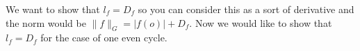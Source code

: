 \documentclass[11 pt]{report}
\theoremstyle{definition}
\theoremstyle{definition}
\begin{document}
\indent We want to show that $l_f = D_f$ so you can consider this as a sort of derivative and the norm would be $\|f\|_G=|f(o)|+D_f$. Now we would like to show that $l_f = D_f$ for the case of one even cycle. 



%



%







\pagebreak
\end{document}

